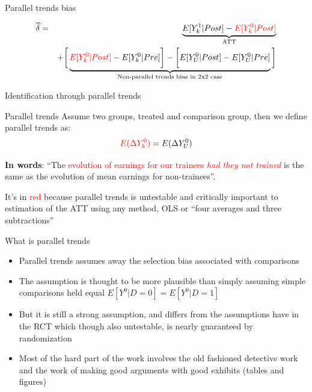 \documentclass{beamer}
\begin{document}
\begin{frame}{Parallel trends bias}

\begin{eqnarray*}
\widehat{\delta} &=& \underbrace{E[Y^1_k | Post] - \textcolor{red}{E[Y^0_k | Post]}}_{\mathclap{\text{ATT}}} \\
&& + \bigg [  \underbrace{\textcolor{red}{E[Y^0_k | Post]} - E[Y^0_k | Pre] \bigg ] - \bigg [ E[Y^0_U | Post] - E[Y_U^0 | Pre] }_{\mathclap{\text{Non-parallel trends bias in 2x2 case}}} \bigg ]
\end{eqnarray*}


\end{frame}

\begin{frame}{Identification through parallel trends}
	

	\begin{block}{Parallel trends}
	Assume two groups, treated and comparison group, then we define parallel trends as:	 $$\textcolor{red}{E(}\textcolor{red}{\Delta Y^0_k)} = E(\Delta Y^0_U)$$
	\end{block}

\textbf{In words}: ``The \textcolor{red}{evolution of earnings for our trainees \emph{had they not trained}} is the same as the evolution of mean earnings for non-trainees''.  

\bigskip

It's in \textcolor{red}{red} because parallel trends is untestable and critically important to estimation of the ATT using any method, OLS or ``four averages and three subtractions''


	
\end{frame}


\begin{frame}{What is parallel trends}

\begin{itemize}
\item Parallel trends assumes away the selection bias associated with comparisons
\item The assumption is thought to be more plausible than simply assuming simple comparisons held equal $E[Y^0|D=0]=E[Y^0|D=1]$
\item But it is still a strong assumption, and differs from the assumptions have in the RCT which though also untestable, is nearly guaranteed by randomization
\item Most of the hard part of the work involves the old fashioned detective work and the work of making good arguments with good exhibits (tables and figures)
\end{itemize}

\end{frame}
\end{document}
